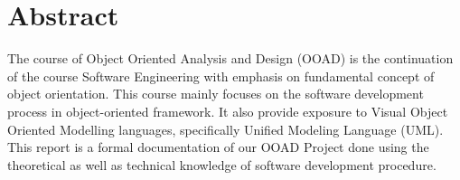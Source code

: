 \section*{Abstract}

The course of Object Oriented Analysis and Design (OOAD) is the continuation of
the course Software Engineering with emphasis on fundamental concept of object
orientation. This course mainly focuses on the software development process in
object-oriented framework. It also provide exposure to Visual Object Oriented
Modelling languages, specifically Unified Modeling Language (UML). This report
is a formal documentation of our OOAD Project done using the theoretical as
well as technical knowledge of software development procedure.
